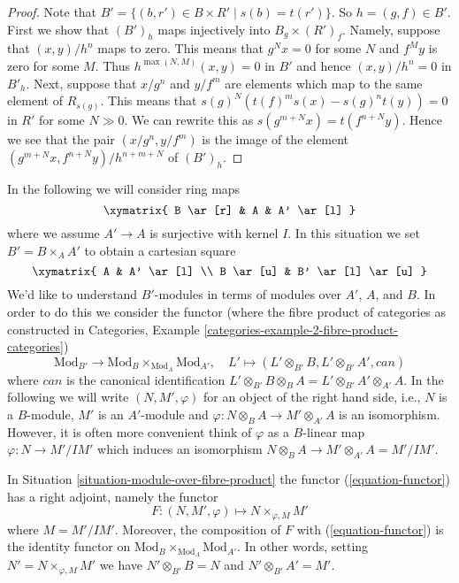 \begin{proof}
Note that $B' = \{(b, r') \in B \times R' \mid s(b) = t(r')\}$.
So $h = (g, f) \in B'$. First we show that $(B')_h$ maps
injectively into $B_g \times (R')_f$. Namely, suppose that
$(x, y)/h^n$ maps to zero. This means that
$g^Nx = 0$ for some $N$ and $f^My$ is zero for some $M$.
Thus $h^{\max(N, M)}(x, y) = 0$ in $B'$ and hence $(x, y)/h^n = 0$
in $B'_h$.
Next, suppose that $x/g^n$ and $y/f^m$ are elements
which map to the same element of $R_{s(g)}$.
This means that $s(g)^N(t(f)^ms(x) - s(g)^nt(y)) = 0$ in $R'$
for some $N \gg 0$. We can rewrite this as
$s(g^{m + N}x) = t(f^{n + N}y)$. Hence we see that the
pair $(x/g^n, y/f^m)$ is the image of the element
$(g^{m + N}x, f^{n + N}y)/h^{n + m + N}$ of
$(B')_h$.
\end{proof}

\begin{situation}
\label{situation-module-over-fibre-product}
In the following we will consider ring maps
$$
\xymatrix{
B \ar[r] & A & A' \ar[l]
}
$$
where we assume $A' \to A$ is surjective with kernel $I$.
In this situation we set $B' = B \times_A A'$ to
obtain a cartesian square
$$
\xymatrix{
A & A' \ar[l] \\
B \ar[u] & B' \ar[l] \ar[u]
}
$$
We'd like to understand $B'$-modules in terms of modules over $A'$, $A$,
and $B$. In order to do this we consider the functor (where the
fibre product of categories as constructed in
Categories, Example \ref{categories-example-2-fibre-product-categories})
\begin{equation}
\label{equation-functor}
\text{Mod}_{B'} \longrightarrow
\text{Mod}_B \times_{\text{Mod}_A} \text{Mod}_{A'},\quad
L' \longmapsto (L' \otimes_{B'} B, L' \otimes_{B'} A', can)
\end{equation}
where $can$ is the canonical identification
$L' \otimes_{B'} B \otimes_B A = L' \otimes_{B'} A' \otimes_{A'} A$.
In the following we will write $(N, M', \varphi)$ for an object
of the right hand side, i.e., $N$ is a $B$-module, $M'$ is an $A'$-module
and $\varphi : N \otimes_B A \to M' \otimes_{A'} A$ is an isomorphism.
However, it is often more convenient think of $\varphi$ as a $B$-linear
map $\varphi : N \to M'/IM'$ which induces an isomorphism
$N \otimes_B A \to M' \otimes_{A'} A = M'/IM'$.
\end{situation}

\begin{lemma}
\label{lemma-module-over-fibre-product}
In Situation \ref{situation-module-over-fibre-product}
the functor (\ref{equation-functor}) has a right adjoint, namely
the functor
$$
F : (N, M', \varphi) \longmapsto N \times_{\varphi, M} M'
$$
where $M = M'/IM'$. Moreover, the composition of $F$ with
(\ref{equation-functor}) is the identity functor on
$\text{Mod}_B \times_{\text{Mod}_A} \text{Mod}_{A'}$. In other words,
setting $N' = N \times_{\varphi, M} M'$ we have
$N' \otimes_{B'} B = N$ and $N' \otimes_{B'} A' = M'$.
\end{lemma}

